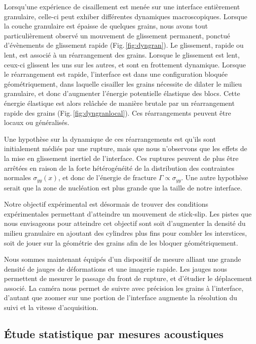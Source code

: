 Lorsqu'une expérience de cisaillement est menée sur une interface entièrement granulaire, celle-ci peut exhiber différentes dynamiques macroscopiques. Lorsque la couche granulaire est épaisse de quelques grains, nous avons tout particulièrement observé un mouvement de glissement permanent, ponctué d'évènements de glissement rapide (Fig.\,\ref{fig:dyngran}). Le glissement, rapide ou lent, est associé à un réarrangement des grains. Lorsque le glissement est lent, ceux-ci glissent les uns sur les autres, et sont en frottement dynamique. Lorsque le réarrangement est rapide, l'interface est dans une configuration bloquée géométriquement, dans laquelle cisailler les grains nécessite de dilater le milieu granulaire, et donc d'augmenter l'énergie potentielle élastique des blocs. Cette énergie élastique est alors relâchée de manière brutale par un réarrangement rapide des grains (Fig.\,\ref{fig:dyngranlocal}). Ces réarrangements peuvent être locaux ou généralisés.

Une hypothèse sur la dynamique de ces réarrangements est qu'ils sont initialement médiés par une rupture, mais que nous n'observons que les effets de la mise en glissement inertiel de l'interface. Ces ruptures peuvent de plus être arrêtées en raison de la forte hétérogénéité de la distribution des contraintes normales $\sigma_{yy}(x)$, et donc de l'énergie de fracture $\Gamma\propto\sigma_{yy}$. Une autre hypothèse serait que la zone de nucléation est plus grande que la taille de notre interface.

Notre objectif expérimental est désormais de trouver des conditions expérimentales permettant d'atteindre un mouvement de stick-slip. Les pistes que nous envisageons pour atteindre cet objectif sont soit d'augmenter la densité du milieu granulaire en ajoutant des cylindres plus fins pour combler les interstices, soit de jouer sur la géométrie des grains afin de les bloquer géométriquement.

Nous sommes maintenant équipés d'un dispositif de mesure alliant une grande densité de jauges de déformations et une imagerie rapide. Les jauges nous permettent de mesurer le passage du front de rupture, et d'étudier le déplacement associé. La caméra nous permet de suivre avec précision les grains à l'interface, d'autant que zoomer sur une portion de l'interface augmente la résolution du suivi et la vitesse d'acquisition.





\subsection{Étude statistique par mesures acoustiques}


